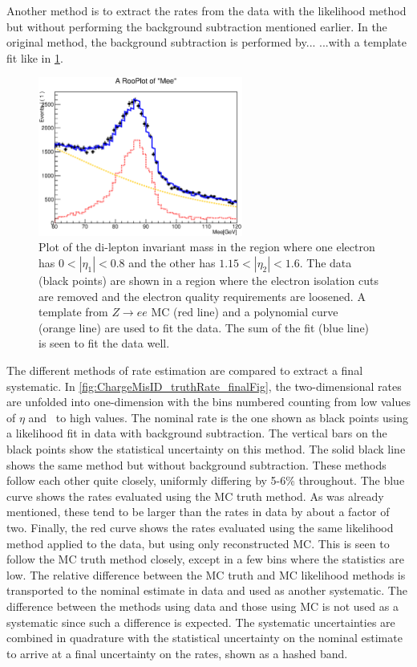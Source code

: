 Another method is to extract the rates from the data with the 
likelihood method but without performing the background
subtraction mentioned earlier. In the original method, 
the background subtraction is performed by... 
...with a template fit like in \fig\ref{fig:chargemisid_fitexample}.

\begin{figure}[htp]
\centering
\includegraphics[width=0.6\textwidth]{figures/ChargeMisID/Tot_Polynomial_0_2.eps}
\caption{Plot of the di-lepton invariant mass 
in the region where one electron has $0 < |\eta_1| < 0.8$
and the other has $1.15 < |\eta_2|<1.6$. The data (black points)
are shown in a region where the electron isolation cuts are removed
and the electron quality requirements are loosened.
A template from $Z\rightarrow ee$ MC (red line) and a polynomial
curve (orange line) are used to fit the data. The sum of the fit
(blue line) is seen to fit the data well.}
\label{fig:chargemisid_fitexample}
\end{figure} 


The different methods of rate estimation are compared to extract
a final systematic. In \fig\ref{fig:ChargeMisID_truthRate_finalFig},
the two-dimensional rates are unfolded into one-dimension
with the bins numbered counting from low values of $\eta$ and \pt~to
high values. The nominal rate is the one shown as black points
using a likelihood fit in data with background subtraction. The vertical
bars on the black points show the statistical uncertainty on this method.
The solid black line shows the same method but without background subtraction.
These methods follow each other quite closely, uniformly differing by 
5-6\% throughout.  The blue curve shows the rates evaluated
using the MC truth method. As was already mentioned, these tend
to be larger than the rates in data by about a factor of two. Finally, 
the red curve shows the rates evaluated using the same likelihood method
applied to the data, but using only reconstructed MC. This is seen to follow
the MC truth method closely, except in a few bins where the statistics
are low. The relative difference between the MC truth and MC likelihood methods
is transported to the nominal estimate in data and used as another systematic.
The difference between the methods using data and those using MC is not
used as a systematic since such a difference is expected.
The systematic uncertainties are combined in quadrature with the statistical
uncertainty on the nominal estimate to arrive at a final uncertainty on the
rates, shown as a hashed band.



